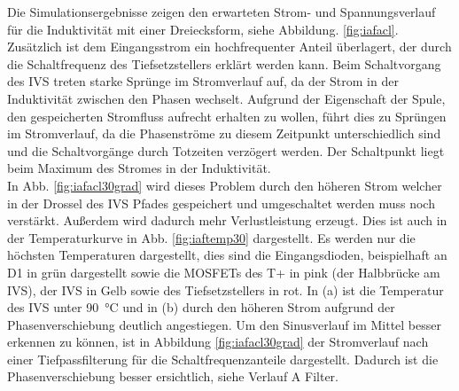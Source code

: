 Die Simulationsergebnisse zeigen den erwarteten Strom- und Spannungsverlauf für die Induktivität mit einer Dreiecksform, siehe Abbildung. \ref{fig:iafacl}. Zusätzlich ist dem Eingangsstrom ein hochfrequenter Anteil überlagert, der durch die Schaltfrequenz des Tiefsetzstellers erklärt werden kann. Beim Schaltvorgang des \gls{IVS} treten starke Sprünge im Stromverlauf auf, da der Strom in der Induktivität zwischen den Phasen wechselt. Aufgrund der Eigenschaft der Spule, den gespeicherten Stromfluss aufrecht erhalten zu wollen, führt dies zu Sprüngen im Stromverlauf, da die Phasenströme zu diesem Zeitpunkt unterschiedlich sind und die Schaltvorgänge durch Totzeiten verzögert werden. Der Schaltpunkt liegt beim Maximum des Stromes in der Induktivität.\\
In Abb. \ref{fig:iafacl30grad} wird dieses Problem durch den höheren Strom welcher in der Drossel des \gls{IVS} Pfades gespeichert und umgeschaltet werden muss noch verstärkt. Außerdem wird dadurch mehr Verlustleistung erzeugt. Dies ist auch in der Temperaturkurve in Abb. \ref{fig:iaftemp30} dargestellt. Es werden nur die höchsten Temperaturen dargestellt, dies sind die Eingangsdioden, beispielhaft an D1 in grün dargestellt sowie die \gls{MOSFET}s des T+ in pink (der Halbbrücke am \gls{IVS}), der \gls{IVS} in Gelb sowie des Tiefsetzstellers in rot. In (a) ist die Temperatur des IVS unter 90~°C und in (b) durch den höheren Strom aufgrund der Phasenverschiebung deutlich angestiegen. Um den Sinusverlauf im Mittel besser erkennen zu können, ist in Abbildung \ref{fig:iafacl30grad} der Stromverlauf nach einer Tiefpassfilterung für die Schaltfrequenzanteile dargestellt. Dadurch ist die Phasenverschiebung besser ersichtlich, siehe Verlauf A Filter.
